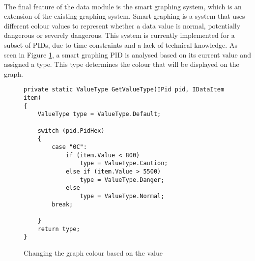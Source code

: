 {		\paragraph{}{
		The final feature of the data module is the smart graphing system, which is an extension of the existing graphing system. Smart graphing is a system that uses different colour values to represent whether a data value is normal, potentially dangerous or severely dangerous. This system is currently implemented for a subset of PIDs, due to time constraints and a lack of technical knowledge. As seen in Figure \ref{code:ValueType}, a smart graphing PID is analysed based on its current value and assigned a type. This type determines the colour that will be displayed on the graph.
		}			
		
		\begin{figure}[h]
			\begin{lstlisting}		
private static ValueType GetValueType(IPid pid, IDataItem item)
{
	ValueType type = ValueType.Default;
				
	switch (pid.PidHex)
	{
		case "0C":		
			if (item.Value < 800)
				type = ValueType.Caution;
			else if (item.Value > 5500)
				type = ValueType.Danger;
			else
				type = ValueType.Normal;
		break;

	}
	return type;
}
			\end{lstlisting}
			\caption{Changing the graph colour based on the value}
			\label{code:ValueType}
		\end{figure}		
		
		
		\label{ssec:DataModuleDesc}
	}

